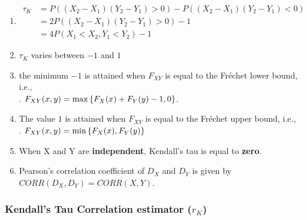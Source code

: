 \begin{enumerate}
    \item
    $
        \begin{aligned}
            \tau_K
            & = P((X_2 - X_1)(Y_2 - Y_1) > 0) - P((X_2 - X_1)(Y_2 - Y_1) < 0) \\
            &= 2 P((X_2 - X_1)(Y_2 - Y_1) > 0) - 1 \\
            &= 4 P(X_1 < X_2, Y_1 < Y_2) - 1
        \end{aligned}
    $
    \hfill \cite{statistics/book/Statistics-for-Data-Scientists/Maurits-Kaptein}

    \item $\tau_K$ varies between $-1$ and $1$
    \hfill \cite{statistics/book/Statistics-for-Data-Scientists/Maurits-Kaptein}

    \item the minimum $-1$ is attained when $F_{X Y}$ is equal to the Fréchet lower bound, i.e.,
    \hfill \cite{statistics/book/Statistics-for-Data-Scientists/Maurits-Kaptein}
    \\
    .\hfill
    $F _{X Y} (x, y) = \max\left\{F_X (x) + F_Y (y) - 1, 0\right\}$.
    \hfill \cite{statistics/book/Statistics-for-Data-Scientists/Maurits-Kaptein}

    \item The value $1$ is attained when $F_{X Y}$ is equal to the Fréchet upper bound, i.e.,
    \hfill \cite{statistics/book/Statistics-for-Data-Scientists/Maurits-Kaptein}
    \\
    .\hfill
    $F_{X Y} (x, y) = \min\left\{F_X (x), F_Y (y)\right\}$
    \hfill \cite{statistics/book/Statistics-for-Data-Scientists/Maurits-Kaptein}

    \item When X and Y are \textbf{independent}, Kendall’s tau is equal to \textbf{zero}.
    \hfill \cite{statistics/book/Statistics-for-Data-Scientists/Maurits-Kaptein}

    \item Pearson’s correlation coefficient of $D_X$ and $D_Y$ is given by $CORR(D_X , D_Y ) = CORR(X, Y )$.
    \hfill \cite{statistics/book/Statistics-for-Data-Scientists/Maurits-Kaptein}

\end{enumerate}




\subsubsection{Kendall’s Tau Correlation estimator ($r_K$)}

